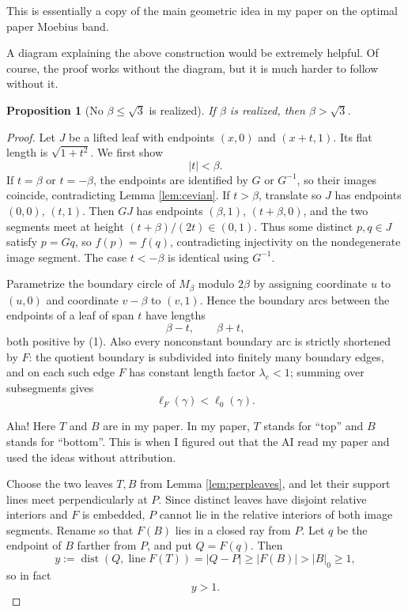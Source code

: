 \documentclass[12pt]{article}
\theoremstyle{plain}
\newtheorem{proposition}[theorem]{Proposition}
\newcommand{\review}[1]{\begin{reviewbox}#1\end{reviewbox}}
\begin{document}
\review{This is essentially a copy of the main geometric idea in my paper on the optimal paper Moebius band.}

\review{A diagram explaining the above construction would be extremely helpful.  Of course, the proof works without the diagram, but it is much harder to follow without it.}


\begin{proposition}[No \(\beta\le\sqrt3\) is realized]\label{prop:lower}
If \(\beta\) is realized, then \(\beta>\sqrt3\).
\end{proposition}

\begin{proof}
Let \(J\) be a lifted leaf with endpoints \((x,0)\) and \((x+t,1)\).  Its flat
length is \(\sqrt{1+t^2}\).  We first show
\[
|t|<\beta. \tag{1}
\]
If \(t=\beta\) or \(t=-\beta\), the endpoints are identified by \(G\) or
\(G^{-1}\), so their images coincide, contradicting Lemma \ref{lem:cevian}.  If
\(t>\beta\), translate so \(J\) has endpoints \((0,0)\), \((t,1)\).  Then
\(GJ\) has endpoints \((\beta,1)\), \((t+\beta,0)\), and the two segments meet
at height \((t+\beta)/(2t)\in(0,1)\).  Thus some distinct \(p,q\in J\) satisfy
\(p=Gq\), so \(f(p)=f(q)\), contradicting injectivity on the nondegenerate
image segment.  The case \(t<-\beta\) is identical using \(G^{-1}\).

Parametrize the boundary circle of \(M_\beta\) modulo \(2\beta\) by assigning
coordinate \(u\) to \((u,0)\) and coordinate \(v-\beta\) to \((v,1)\).  Hence
the boundary arcs between the endpoints of a leaf of span \(t\) have lengths
\[
\beta-t,\qquad \beta+t, \tag{2}
\]
both positive by (1).  Also every nonconstant boundary arc is strictly
shortened by \(F\): the quotient boundary is subdivided into finitely many
boundary edges, and on each such edge \(F\) has constant length factor
\(\lambda_e<1\); summing over subsegments gives
\[
\ell_F(\gamma)<\ell_0(\gamma). \tag{3}
\]


\review{Aha!  Here $T$ and $B$ are in my paper.  In my paper, $T$ stands for ``top'' and $B$ stands for ``bottom''.  This is when I figured out that the AI read my paper and used the ideas without attribution.}

Choose the two leaves \(T,B\) from Lemma \ref{lem:perpleaves}, and let their
support lines meet perpendicularly at \(P\).  Since distinct leaves have
disjoint relative interiors and \(F\) is embedded, \(P\) cannot lie in the
relative interiors of both image segments.  Rename so that \(F(B)\) lies in a
closed ray from \(P\).  Let \(q\) be the endpoint of \(B\) farther from \(P\),
and put \(Q=F(q)\).  Then
\[
y:=\operatorname{dist}(Q,\operatorname{line}F(T))=|Q-P|\ge |F(B)|>|B|_0\ge1,
\]
so in fact
\[
y>1. \tag{4}
\]



\end{proof}
\end{document}
